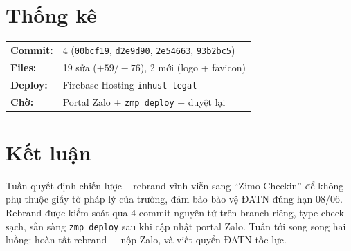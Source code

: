 \documentclass{article}
\begin{document}
\section{Thống kê}

\begin{tabularx}{\textwidth}{@{}l X@{}}
\textbf{Commit:} & 4 (\texttt{00bcf19}, \texttt{d2e9d90}, \texttt{2e54663}, \texttt{93b2bc5}) \\
\textbf{Files:} & 19 sửa ($+59/-76$), 2 mới (logo + favicon) \\
\textbf{Deploy:} & Firebase Hosting \texttt{inhust-legal} \\
\textbf{Chờ:} & Portal Zalo + \texttt{zmp deploy} + duyệt lại \\
\end{tabularx}

\section{Kết luận}

Tuần quyết định chiến lược -- rebrand vĩnh viễn sang ``Zimo Checkin'' để không phụ thuộc giấy tờ pháp lý của trường, đảm bảo bảo vệ ĐATN đúng hạn 08/06. Rebrand được kiểm soát qua 4 commit nguyên tử trên branch riêng, type-check sạch, sẵn sàng \texttt{zmp deploy} sau khi cập nhật portal Zalo. Tuần tới song song hai luồng: hoàn tất rebrand + nộp Zalo, và viết quyển ĐATN tốc lực.
\end{document}

